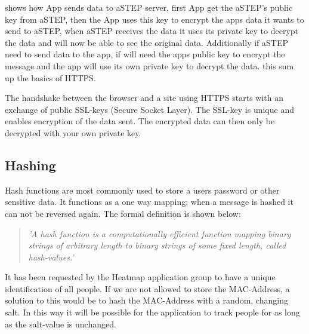  shows how App sends data to aSTEP server, first App get the aSTEP's public key from aSTEP, then the App uses this key to encrypt the apps data it wants to send to aSTEP, when aSTEP receives the data it uses its private key to decrypt the data and will now be able to see the original data. Additionally if aSTEP need to send data to the app, if will need the apps public key to encrypt the message and the app will use its own private key to decrypt the data. this sum up the basics of HTTPS.

The handshake between the browser and a site using HTTPS starts with an exchange of public SSL-keys (Secure Socket Layer). The SSL-key is unique and enables encryption of the data sent. The encrypted data can then only be decrypted with your own private key\cite{HTTPS}. 


\subsection*{Hashing}
Hash functions are most commonly used to store a users password or other sensitive data. It functions as a one way mapping; when a message is hashed it can not be reversed again. The formal definition is shown below:
\begin{quote}
\textit{'A hash function is a computationally efficient function mapping binary strings of arbitrary length to binary strings of some fixed length, called hash-values.'\cite{Hash_def}}
\end{quote}

It has been requested by the Heatmap application group to have a unique identification of all people. If we are not allowed to store the MAC-Address, a solution to this would be to hash the MAC-Address with a random, changing salt. In this way it will be possible for the application to track people for as long as the salt-value is unchanged.

